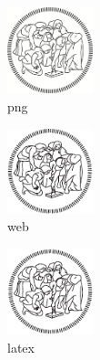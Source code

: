 \documentclass[%
 	12pt,
 	a4paper
]{article}
\begin{document}
\begin{figure}
	\centering
	\includegraphics[width=2.5cm]{../../img/logopoli.png}\\
	\caption{png}
	\includegraphics[width=2.5cm]{../../img/logopoli_web.pdf}\\
	\caption{web}
	\includegraphics[width=2.5cm]{../../img/logopoli_latex.pdf}
	\caption{latex}
\end{figure}
\end{document}
